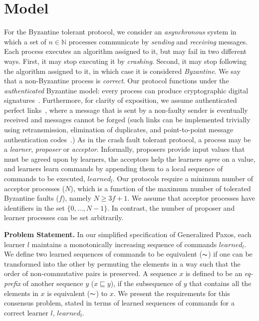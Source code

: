 \section{Model} \label{bft_model}

For the Byzantine tolerant protocol, we consider an \emph{asynchronous} system in which a set of $n \in \mathbb{N}$ processes communicate by 
\emph{sending} and \emph{receiving} messages. Each process executes an algorithm assigned to it, but may fail in two different ways. First, it may stop executing it by \emph{crashing}. Second, it may stop following the algorithm assigned to it, in which case it is considered \emph{Byzantine}. We say that a non-Byzantine process is \emph{correct}. Our protocol functions under the \emph{authenticated} Byzantine model: every process can produce cryptographic digital signatures~\cite{quorum}. 
Furthermore, for clarity of exposition, we assume authenticated perfect links~\cite{cgr:book}, where a message that is sent by a non-faulty sender is eventually received and messages cannot be forged (such links can be implemented trivially using retransmission, elimination of duplicates, and point-to-point message authentication codes~\cite{cgr:book}.) As in the crash fault tolerant protocol, a process may be a \emph{learner}, \emph{proposer} or \emph{acceptor}. Informally, proposers provide input values that must be agreed upon by learners, the acceptors help the learners \emph{agree} on a value, and learners learn commands by appending them to a local sequence of commands to be executed, $learned_l$. Our protocols require a minimum number of acceptor processes ($N$), which is a function of the maximum number of tolerated Byzantine faults ($f$), namely $N \ge 3f+1$. We assume that acceptor processes have identifiers in the set $\{0,...,N-1\}$. In contrast, the number of proposer and learner processes can be set arbitrarily.\par
\noindent\textbf{Problem Statement.}
In our simplified specification of Generalized Paxos, each learner $l$ maintains a monotonically increasing sequence of commands $learned_l$. 
We define two learned sequences of commands to be equivalent ($\thicksim$) 
if one can be transformed into the other by permuting the elements in a way such that the order of non-commutative pairs is preserved. A sequence $x$ is defined to be an \textit{eq-prefix} of another sequence $y$ ($x \sqsubseteq y$), if the subsequence of $y$ that contains all the elements in $x$ is equivalent ($\thicksim$) to $x$. 
We present the requirements for this consensus problem, stated in terms of learned sequences of commands for a correct learner $l$, $learned_l$. 
